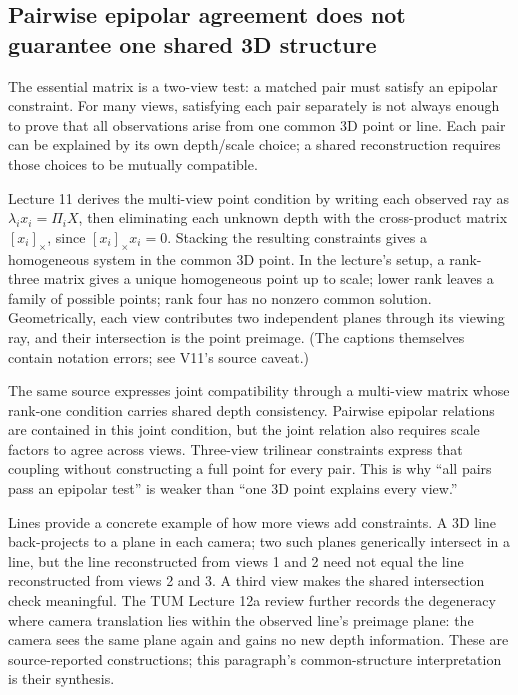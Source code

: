 \subsection{Pairwise epipolar agreement does not guarantee one shared 3D structure}\label{02-foundations-ii-ch036-pairwise-epipolar-agreement-does-not-guarantee-one-shared-3d-structure}

\hypertarget{02-foundations-ii-ch036-pairwise-epipolar-agreement-does-not-guarantee-one-shared-3d-structure}{}

The essential matrix is a two-view test: a matched pair must satisfy an epipolar constraint. For many views, satisfying each pair separately is not always enough to prove that all observations arise from one common 3D point or line. Each pair can be explained by its own depth/scale choice; a shared reconstruction requires those choices to be mutually compatible.

Lecture 11 derives the multi-view point condition by writing each observed ray as \(\lambda_i x_i=\Pi_iX\), then eliminating each unknown depth with the cross-product matrix \([x_i]_\times\), since \([x_i]_\times x_i=0\). Stacking the resulting constraints gives a homogeneous system in the common 3D point. In the lecture's setup, a rank-three matrix gives a unique homogeneous point up to scale; lower rank leaves a family of possible points; rank four has no nonzero common solution. Geometrically, each view contributes two independent planes through its viewing ray, and their intersection is the point preimage. (The captions themselves contain notation errors; see V11's source caveat.)

The same source expresses joint compatibility through a multi-view matrix whose rank-one condition carries shared depth consistency. Pairwise epipolar relations are contained in this joint condition, but the joint relation also requires scale factors to agree across views. Three-view trilinear constraints express that coupling without constructing a full point for every pair. This is why ``all pairs pass an epipolar test'' is weaker than ``one 3D point explains every view.''

Lines provide a concrete example of how more views add constraints. A 3D line back-projects to a plane in each camera; two such planes generically intersect in a line, but the line reconstructed from views 1 and 2 need not equal the line reconstructed from views 2 and 3. A third view makes the shared intersection check meaningful. The TUM Lecture 12a review further records the degeneracy where camera translation lies within the observed line's preimage plane: the camera sees the same plane again and gains no new depth information. These are source-reported constructions; this paragraph's common-structure interpretation is their synthesis.

